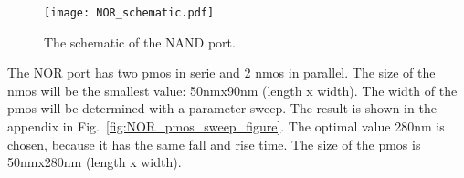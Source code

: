 \begin{figure}[htp]
\texttt{[image: NOR\_schematic.pdf]}
\caption{The schematic of the NAND port.}
\label{fig:NOR_schematic_figure}
\end{figure}

The NOR port has two pmos in serie and 2 nmos in parallel. The size of the nmos will be the smallest value: 50nmx90nm (length x width). The width of the pmos will be determined with a parameter sweep. The result is shown in the appendix in Fig.~\ref{fig:NOR_pmos_sweep_figure}. The optimal value 280nm is chosen, because it has the same fall and rise time. The size of the pmos is 50nmx280nm (length x width).
